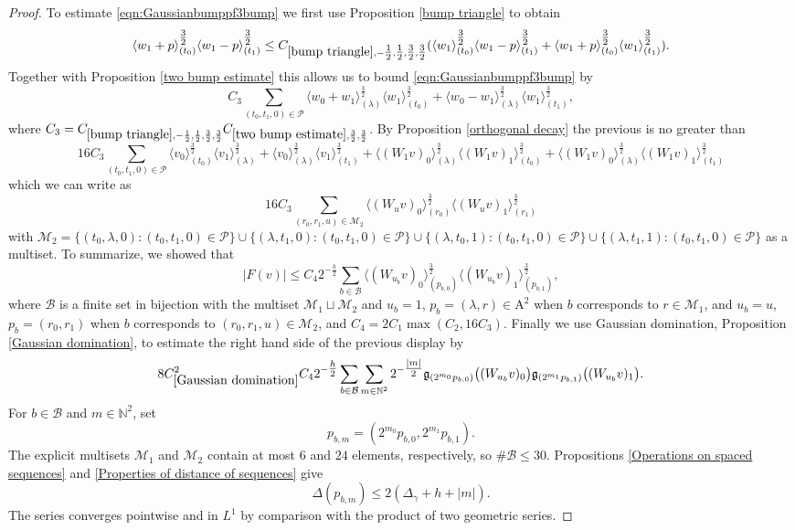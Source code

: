 \documentclass[12pt,reqno]{amsart}
\theoremstyle{plain}
\numberwithin{equation}{section}
\theoremstyle{remark}
\newcommand{\N}{{\mathbb N}}
\begin{document}
\begin{proof}[Proof]
To estimate \eqref{eqn:Gaussianbumppf3bump} we first use Proposition \ref{bump triangle} to obtain
\[ \langle w_1+p\rangle_{(t_0)}^{\tfrac32} \langle w_1-p\rangle_{(t_1)}^{\tfrac32}
\leq C_{\ref{bump triangle},-\tfrac12,\tfrac12,\tfrac32,\tfrac32}(\langle w_1\rangle_{(t_0)}^{\tfrac32} \langle w_1-p\rangle_{(t_1)}^{\tfrac32} + \langle w_1+p\rangle_{(t_0)}^{\tfrac32} \langle w_1\rangle_{(t_1)}^{\tfrac32}). \]
Together with Proposition \ref{two bump estimate} this allows us to bound \eqref{eqn:Gaussianbumppf3bump} by
\[ C_3 \sum_{(t_0,t_1,0)\in\mathcal{P}} \langle w_0+w_1\rangle_{(\lambda)}^{\tfrac32} \langle w_1\rangle_{(t_0)}^{\tfrac32} + \langle w_0-w_1\rangle_{(\lambda)}^{\tfrac32} \langle w_1\rangle_{(t_1)}^{\tfrac32},   \]
where $C_3=C_{\ref{bump triangle},-\frac12,\frac12,\frac32,\frac32} C_{\ref{two bump estimate},\frac32,\frac32}$.
By Proposition \ref{orthogonal decay} the previous is no greater than
\[
16C_3\sum_{(t_0,t_1,0)\in\mathcal P}
\langle v_0\rangle_{(t_0)}^{\tfrac32}
\langle v_1\rangle_{(\lambda)}^{\tfrac32} +
\langle v_0\rangle_{(\lambda)}^{\tfrac32}
\langle v_1\rangle_{(t_1)}^{\tfrac32} +
\langle (W_1v)_0\rangle_{(\lambda)}^{\tfrac32}
\langle (W_1v)_1\rangle_{(t_0)}^{\tfrac32}+
\langle (W_1v)_0\rangle_{(\lambda)}^{\tfrac32}
\langle (W_1v)_1\rangle_{(t_1)}^{\tfrac32}
\]
which we can write as
\[ 16C_3 \sum_{(r_0,r_1,u)\in\mathcal{M}_2}\langle (W_u v)_0\rangle_{(r_0)}^{\tfrac32}
\langle (W_u v)_1\rangle_{(r_1)}^{\tfrac32} \]
with $\mathcal{M}_2
=
\{(t_0,\lambda,0):(t_0,t_1,0)\in\mathcal{P}\}
\cup
\{(\lambda,t_1,0):(t_0,t_1,0)\in\mathcal{P}\}
\cup
\{(\lambda,t_0,1):(t_0,t_1,0)\in\mathcal{P}\}
\cup
\{(\lambda,t_1,1):(t_0,t_1,0)\in\mathcal{P}\}$ as a multiset.
To summarize, we showed that
\[ |F(v)|\le C_4 2^{-\tfrac h2} \sum_{b\in\mathcal{B}}\langle (W_{u_b} v)_0\rangle_{(p_{b,0})}^{\tfrac32}
\langle (W_{u_b} v)_1\rangle_{(p_{b,1})}^{\tfrac32},  \]
where $\mathcal{B}$ is a finite set in bijection with the multiset $\mathcal{M}_1\sqcup \mathcal{M}_2$ and $u_b=1$, $p_{b}=(\lambda, r)\in\mathrm{A}^2$ when $b$ corresponds to $r\in \mathcal{M}_1$, and $u_b=u$, $p_b=(r_0,r_1)$ when $b$ corresponds to $(r_0,r_1,u)\in\mathcal{M}_2$, and
$C_4 = 2C_1 \max(C_2,16C_3).$
Finally we use Gaussian domination, Proposition \ref{Gaussian domination}, to estimate the right hand side of the previous display by
\[ 8 C_{\ref{Gaussian domination}}^2 C_4  2^{-\tfrac h2}
\sum_{b\in\mathcal B}
\sum_{m\in\mathbb{N}^2}
2^{-\tfrac{|m|}{2}}
\mathfrak{g}_{(2^{m_0}p_{b,0})}\big((W_{u_b}v)_0\big)
\mathfrak{g}_{(2^{m_1}p_{b,1})}\big((W_{u_b}v)_1\big). \]
For $b\in\mathcal B$ and $m\in\N^2$, set
\[
p_{b,m}=(2^{m_0}p_{b,0},2^{m_1}p_{b,1}).
\]
The explicit multisets $\mathcal M_1$ and $\mathcal M_2$ contain at most $6$ and $24$ elements, respectively, so $\#\mathcal B\le30$. Propositions \ref{Operations on spaced sequences} and \ref{Properties of distance of sequences} give
\[
\Delta(p_{b,m})\le2(\Delta_\gamma+h+|m|).
\]
The series converges pointwise and in $L^1$ by comparison with the product of two geometric series.

\medskip
\end{proof}
\end{document}

